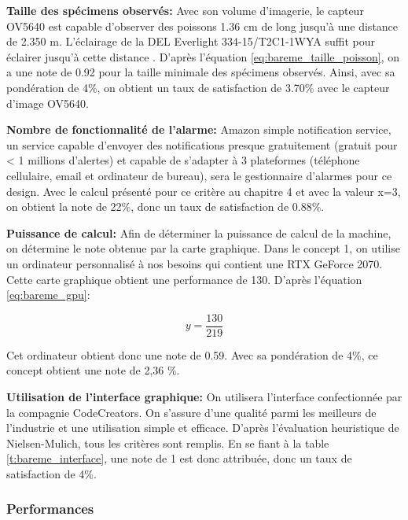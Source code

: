 \textbf{Taille des spécimens observés:}
Avec son volume d'imagerie, le capteur OV5640 est capable d'observer des poissons 1.36 cm de long jusqu'à une distance de 2.350 m. L'éclairage de la DEL Everlight 334-15/T2C1-1WYA suffit pour éclairer jusqu'à cette distance \cite{DEL}. D'après l'équation \ref{eq:bareme_taille_poisson}, on a une note de 0.92 pour la taille minimale des spécimens observés. Ainsi, avec sa pondération de 4\%, on obtient un taux de satisfaction de 3.70\% avec le capteur d'image OV5640.
\vspace{5mm}

\textbf{Nombre de fonctionnalité de l'alarme:} Amazon simple notification service, un service capable d'envoyer des notifications presque gratuitement (gratuit pour < 1 millions d'alertes) et capable de s'adapter à 3 plateformes (téléphone cellulaire, email et ordinateur de bureau), sera le gestionnaire d'alarmes pour ce design. Avec le calcul présenté pour ce critère au chapitre 4 et avec la valeur x=3, on obtient la note de 22\%, donc un taux de satisfaction de 0.88\%.
\vspace{5mm}

\textbf{Puissance de calcul:} Afin de déterminer la puissance de calcul de la machine, on détermine le note obtenue par la carte graphique. Dans le concept 1, on utilise un ordinateur personnalisé à nos besoins qui contient une RTX GeForce 2070. Cette carte graphique obtient une performance de 130. D'après l'équation \ref{eq:bareme_gpu}:

\begin{equation}
    y = \frac{130}{219}
\end{equation}

Cet ordinateur obtient donc une note de 0.59. Avec sa pondération de 4\%, ce concept obtient une note de 2,36 \%.
\vspace{5mm}


\textbf{Utilisation de l’interface graphique:}
On utilisera l’interface confectionnée par la compagnie CodeCreators. On s’assure d’une qualité parmi les meilleurs de l’industrie et une utilisation simple et efficace. D’après l'évaluation heuristique de Nielsen-Mulich, tous les critères sont remplis. En se fiant à la table \ref{t:bareme_interface}, une note de 1 est donc attribuée, donc un taux de satisfaction de 4\%.


\subsubsection{Performances}

